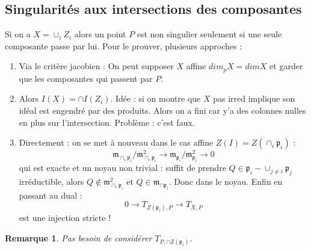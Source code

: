 \documentclass[a4paper,12pt]{book}
\newcommand{\m}{\mathfrak{m}}
\newcommand{\p}{\mathfrak{p}}
\theoremstyle{plain}
\newtheorem{rem}{Remarque}
\theoremstyle{definition}
\theoremstyle{remark}
\begin{document}
\subsection{Singularités aux intersections des composantes}
Si on a $X=\cup_i Z_i$ alors un point $P$ est non singulier 
seulement si une seule composante passe par lui. Pour le prouver,
plusieurs approches :
\begin{enumerate}
    \item Via le critère jacobien : On peut supposer $X$ affine
        $dim_p X= dim X$ et garder que les composantes qui passent
        par $P$.
    \item Alors $I(X)=\cap I(Z_i)$. Idée : si on montre que 
        $X$ pas irred implique son idéal est engendré par des 
        produits. Alors on a fini car y'a des colonnes nulles en
        plus sur l'intersection. Problème : c'est faux.

    \item Directement : on se met à nouveau dans le cas affine
        $Z(I)=Z(\cap_i \p_i)$ :
        \[\m_{\cap_i\p_i}/\m_{\cap_i\p_i}^2\to \m_{\p_i}/\m_{\p_i}^2\to 0\]
        qui est exacte et un noyau non trivial : suffit de prendre
        $Q\in \p_i - \cup_{j\ne i} \p_j$ irréductible, alors 
        $Q\notin \m_{\cap_i\p_i}^2$ et $Q\in\m_{\cap \p_i}$. Donc
        dans le noyau. Enfin en passant au dual :
        \[0\to T_{Z(\p_i),P}\to T_{X,P}\]
        est une injection stricte ! 
\end{enumerate}
\begin{rem}
    Pas besoin de considérer $T_{P,\cap Z(\p_i)}$.
\end{rem}



\printbibliography
\end{document}
